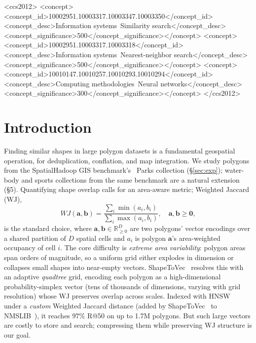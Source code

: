 \documentclass[sigconf]{acmart}
\begin{document}
\begin{CCSXML}
<ccs2012>
<concept><concept_id>10002951.10003317.10003347.10003350</concept_id>
<concept_desc>Information systems~Similarity search</concept_desc>
<concept_significance>500</concept_significance></concept>
<concept><concept_id>10002951.10003317.10003318</concept_id>
<concept_desc>Information systems~Nearest-neighbor search</concept_desc>
<concept_significance>500</concept_significance></concept>
<concept><concept_id>10010147.10010257.10010293.10010294</concept_id>
<concept_desc>Computing methodologies~Neural networks</concept_desc>
<concept_significance>300</concept_significance></concept>
</ccs2012>
\end{CCSXML}
\maketitle

\section{Introduction}
\label{sec:intro}
Finding similar shapes in large polygon datasets is a fundamental geospatial
operation, for deduplication, conflation, and map integration. We study
polygons from the SpatialHadoop GIS benchmark's~\cite{eldawy15} Parks collection
(\S\ref{sec:exp}); water-body and sports collections from the same benchmark are a
natural extension (\S5). Quantifying
shape overlap calls for an area-aware metric; Weighted Jaccard (WJ),
\begin{equation}
  WJ(\mathbf{a},\mathbf{b}) = \frac{\sum_i \min(a_i,b_i)}{\sum_i \max(a_i,b_i)},
  \quad \mathbf{a},\mathbf{b} \ge \mathbf{0},
  \label{eq:wj}
\end{equation}
is the standard choice, where $\mathbf{a},\mathbf{b}\in\mathbb{R}^D_{\ge0}$ are two
polygons' vector encodings over a shared partition of $D$ spatial cells and $a_i$ is
polygon $\mathbf{a}$'s area-weighted occupancy of cell $i$. The core difficulty is
\emph{extreme area variability}: polygon areas span orders of magnitude, so a
uniform grid either explodes in dimension or collapses small shapes into
near-empty vectors. ShapeToVec~\cite{shape2vec} resolves this with an adaptive
\emph{quadtree} grid, encoding each polygon as a high-dimensional probability-simplex
vector (tens of thousands of dimensions, varying with grid resolution) whose WJ
preserves overlap across scales. Indexed with HNSW~\cite{hnsw20} under a \emph{custom}
Weighted Jaccard distance (added by ShapeToVec~\cite{shape2vec} to
NMSLIB~\cite{boytsov13}), it reaches $97\%$ R@50
on up to 1.7M polygons. But such large vectors are costly to store and search;
compressing them while preserving WJ structure is our goal.
\end{document}
